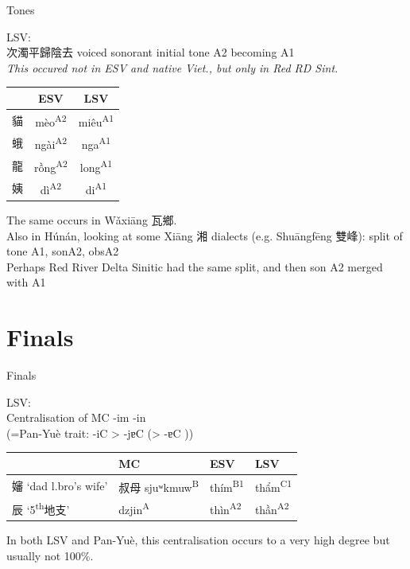 \documentclass{beamer}
\begin{document}
\begin{frame}[fragile]{Tones}

LSV:\\
次濁平歸陰去 voiced sonorant initial tone A2 becoming A1\\
\textit{\small This occured not in ESV and native Viet., but only in Red RD Sint.} 

\bigskip
\begin{tabular}{c|c c}
 & ESV & LSV \\ \hline
貓 & mèo\textsuperscript{A2} & miêu\textsuperscript{A1}\\
蛾 & ngài\textsuperscript{A2} & nga\textsuperscript{A1}\\
龍 & rồng\textsuperscript{A2} & long\textsuperscript{A1}\\
姨 & dì\textsuperscript{A2} & di\textsuperscript{A1}\\
\end{tabular}

\bigskip
The same occurs in Wǎxiāng 瓦鄉.\\
Also in Húnán, looking at some Xiāng 湘 dialects (e.g. Shuāngfēng 雙峰): split of tone A1, sonA2, obsA2\\
Perhaps Red River Delta Sinitic had the same split, and then son A2 merged with A1\\

\end{frame}

\section{Finals}

\begin{frame}[fragile]{Finals}

LSV:\\
Centralisation of MC -im -in\\ 
(=Pan-Yuè trait: -iC > -jɐC (> -ɐC ))\\

\bigskip
\begin{tabular}{l|l|l l}
 & MC & ESV & LSV\\ \hline
嬸 \enquote*{dad l.bro's wife}& 叔母 sjuʷkmuw\textsuperscript{B} & thím\textsuperscript{B1} & thẩm\textsuperscript{C1}\\
辰 \enquote*{5\textsuperscript{th}地支} & dzjin\textsuperscript{A} & thìn\textsuperscript{A2} & thần\textsuperscript{A2}\\ 
\end{tabular}

\bigskip
In both LSV and Pan-Yuè, this centralisation occurs to a very high degree but usually not 100\%.

\end{frame}
\end{document}
